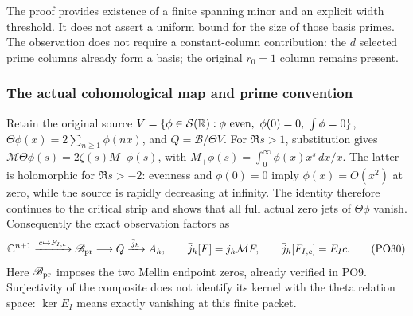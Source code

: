 The proof provides existence of a finite spanning minor and an
explicit width threshold. It does not assert a uniform bound for
the size of those basis primes. The observation does not require
a constant-column contribution: the \(d\) selected prime columns
already form a basis; the original \(r_0=1\) column remains present.

\subsubsection{The actual cohomological map and prime convention}

Retain the original source
\(V=\{\phi\in\mathcal S(\mathbb R):\phi\text{ even},
\ \phi(0)=0,\ \int\phi=0\}\),
\(\Theta\phi(x)=2\sum_{n\ge1}\phi(nx)\), and \(Q=\mathscr B/\Theta V\).
For \(\Re s>1\), substitution gives
\(\mathcal M\Theta\phi(s)=2\zeta(s)M_+\phi(s)\), with
\(M_+\phi(s)=\int_0^\infty\phi(x)x^s\,dx/x\).
The latter is holomorphic for \(\Re s>-2\):
evenness and \(\phi(0)=0\) imply \(\phi(x)=O(x^2)\) at zero,
while the source is rapidly decreasing at infinity.
The identity therefore continues to the critical strip and
shows that all full actual zero jets of \(\Theta\phi\) vanish.
Consequently the exact observation factors as
\[
 \mathbb C^{n+1}\xrightarrow{\,c\mapsto F_{I,c}\,}
 \mathscr B_{\rm pr}\longrightarrow Q
       \xrightarrow{\,\bar j_h\,}A_h,\qquad
 \bar j_h[F]=j_h\mathcal M F,\qquad
 \bar j_h[F_{I,c}]=E_Ic .
 \tag{PO30}\label{PO:po:Qmap}
\]
Here \(\mathscr B_{\rm pr}\) imposes the two Mellin endpoint zeros,
already verified in PO9. Surjectivity of the composite does
not identify its kernel with the theta relation space:
\(\ker E_I\) means exactly vanishing at this finite packet.

